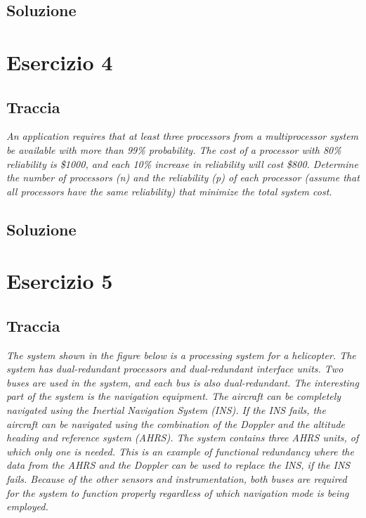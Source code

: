 \clearpage
\subsection{Soluzione}

\clearpage
\section{Esercizio 4}
\subsection{Traccia}
\textit{An application requires that at least three processors from a multiprocessor
system be available with more than 99\% probability. The cost of a processor with
80\% reliability is \$1000, and each 10\% increase in reliability will cost \$800.
Determine the number of processors (n) and the reliability (p) of each processor
(assume that all processors have the same reliability) that minimize the total
system cost.}

\clearpage
\subsection{Soluzione}

\clearpage
\section{Esercizio 5}
\subsection{Traccia}
\textit{The system shown in the figure below is a processing system for a helicopter. The system
has dual-redundant processors and dual-redundant interface units. Two buses are used in
the system, and each bus is also dual-redundant. The interesting part of the system is the
navigation equipment. The aircraft can be completely navigated using the Inertial
Navigation System (INS). If the INS fails, the aircraft can be navigated using the
combination of the Doppler and the altitude heading and reference system (AHRS). The
system contains three AHRS units, of which only one is needed. This is an example of
functional redundancy where the data from the AHRS and the Doppler can be used to
replace the INS, if the INS fails. Because of the other sensors and instrumentation, both
buses are required for the system to function properly regardless of which navigation mode
is being employed.}

